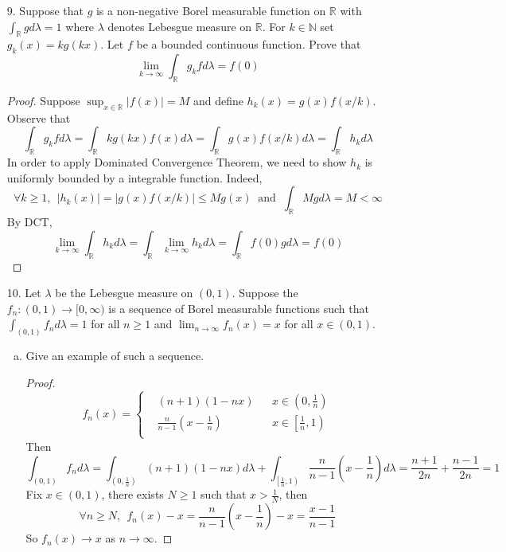 \begin{itemize}
	\item[9.] Suppose that $g$ is a non-negative Borel measurable function on $\mathbb{R}$ with $\int_{\mathbb{R}} gd\lambda = 1$
	where $\lambda$ denotes Lebesgue measure on $\mathbb{R}$. For $k\in \mathbb{N}$ set $g_k(x) = kg(kx)$. Let $f$ be a
	bounded continuous function. Prove that
	$$
	\lim_{k\rightarrow \infty } \int_{\mathbb{R}} g_kfd\lambda = f(0)
	$$
	\begin{proof}
		Suppose $\sup_{x\in \mathbb{R}}|f(x)| = M$ and define $h_k(x) = g(x)f(x/k)$. Observe that 
		$$
		\int_{\mathbb{R}} g_k fd\lambda = \int_{\mathbb{R}} kg(kx)f(x)d\lambda = \int_{\mathbb{R}} g(x)f(x/k)d\lambda = \int_{\mathbb{R}} h_k d\lambda
		$$
		In order to apply Dominated Convergence Theorem, we need to show $h_k$ is uniformly bounded by a integrable function. Indeed, 
		$$
		\forall k\ge 1,~~|h_k(x)| = |g(x)f(x/k)|\le Mg(x) ~\text{  and  }~ \int_{\mathbb{R}} Mgd\lambda = M < \infty 
		$$
		By DCT,
		$$
		\lim_{k\rightarrow \infty} \int_{\mathbb{R}} h_kd\lambda = \int_{\mathbb{R}} \lim_{k\rightarrow \infty } h_k d\lambda = \int_{\mathbb{R}} f(0)gd\lambda = f(0)
		$$
	\end{proof}
	\item[10.]  Let $\lambda$ be the Lebesgue measure on $(0, 1)$. Suppose the $f_n : (0, 1) \rightarrow [0, \infty)$ is
	a sequence of Borel measurable functions such that $\int_{(0,1)}f_nd\lambda=1$ for all $n \ge 1$ and
	$\lim_{n\rightarrow \infty}f_n(x) = x$ for all $x\in (0, 1)$.
	\begin{enumerate}[(a)]
		\item Give an example of such a sequence.
		\begin{proof}
			$$
			f_n(x)  = \left\{
			\begin{aligned}
			&(n+1)\left( 1 - nx\right)& &x\in \left(0, \frac{1}{n}\right)\\
			&\frac{n}{n-1}\left( x-\frac{1}{n}\right)& &x\in \left[\frac{1}{n}, 1\right)\\
			\end{aligned}\right.
			$$
			Then
			$$
			\int_{(0,1)} f_n d\lambda= \int_{ \left(0, \frac{1}{n}\right)}(n+1)\left( 1 - nx\right)d\lambda + \int_{\left[\frac{1}{n}, 1\right)}\frac{n}{n-1}\left( x-\frac{1}{n}\right) d\lambda = \frac{n+1}{2n} + \frac{n-1}{2n} = 1
			$$
			Fix $x\in (0,1)$, there exists $N\ge 1$ such that $x > \frac{1}{N}$, then
			$$
			\forall n\ge N, ~~f_n(x) -x= \frac{n}{n-1}\left( x-\frac{1}{n}\right)- x= \frac{x-1}{n-1}
			$$
			So $f_n(x) \rightarrow x$ as $n\rightarrow \infty$.
		\end{proof}

\end{enumerate}
\end{itemize}
